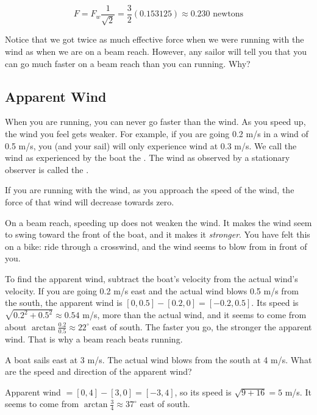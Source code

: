 $$F = F_w \frac{1}{\sqrt{2}} =  \frac{3}{2}(0.153125) \approx 0.230 \text{ newtons}$$

Notice that we got twice as much effective force when we were running with the wind as when we are on a beam reach.  However, any sailor will tell you that you can go much faster
on a beam reach than you can running. Why?
\subsection{Apparent Wind}

When you are running, you can never go faster than the wind. As you speed
up, the wind you feel gets weaker. For example, if you are going 0.2 m/s in a wind
of 0.5 m/s,  you (and your sail) will only experience wind at 0.3 m/s. We call the wind as experienced by the boat
the .  The wind as observed by a stationary observer is called the .

If you are running with the wind, as you approach the speed of the wind,  the force of that wind will decrease towards zero.

On a beam reach, speeding up does not weaken the wind. It makes the wind
seem to swing toward the front of the boat, and it makes it \emph{stronger}.
You have felt this on a bike: ride through a crosswind, and the wind seems
to blow from in front of you.

To find the apparent wind, subtract the boat's velocity from the actual
wind's velocity. If you are going 0.2 m/s east and the actual wind blows
0.5 m/s from the south, the apparent wind is
$[0, 0.5] - [0.2, 0] = [-0.2, 0.5]$. Its speed is
$\sqrt{0.2^2 + 0.5^2} \approx 0.54$ m/s, more than the actual wind, and it
seems to come from about $\arctan\frac{0.2}{0.5} \approx 22^\circ$ east of
south. The faster you go, the stronger the apparent wind. That is why a
beam reach beats running.

\begin{Exercise}[title={Apparent wind}, label=apparent_wind]
A boat sails east at 3 m/s. The actual wind blows from the south at
4 m/s. What are the speed and direction of the apparent wind?
\end{Exercise}
\begin{Answer}[ref=apparent_wind]
Apparent wind $= [0, 4] - [3, 0] = [-3, 4]$, so its speed is
$\sqrt{9 + 16} = 5$ m/s. It seems to come from $\arctan\frac{3}{4} \approx
37^\circ$ east of south.
\end{Answer}

